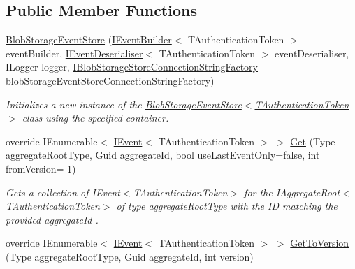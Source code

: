 \subsection*{Public Member Functions}
\begin{DoxyCompactItemize}
\item 
\hyperlink{classCqrs_1_1Azure_1_1BlobStorage_1_1Events_1_1BlobStorageEventStore_a04ce4516e7e1d30339d3f04ba54abe54_a04ce4516e7e1d30339d3f04ba54abe54}{Blob\+Storage\+Event\+Store} (\hyperlink{interfaceCqrs_1_1Events_1_1IEventBuilder}{I\+Event\+Builder}$<$ T\+Authentication\+Token $>$ event\+Builder, \hyperlink{interfaceCqrs_1_1Events_1_1IEventDeserialiser}{I\+Event\+Deserialiser}$<$ T\+Authentication\+Token $>$ event\+Deserialiser, I\+Logger logger, \hyperlink{interfaceCqrs_1_1Azure_1_1BlobStorage_1_1IBlobStorageStoreConnectionStringFactory}{I\+Blob\+Storage\+Store\+Connection\+String\+Factory} blob\+Storage\+Event\+Store\+Connection\+String\+Factory)
\begin{DoxyCompactList}\small\item\em Initializes a new instance of the \hyperlink{classCqrs_1_1Azure_1_1BlobStorage_1_1Events_1_1BlobStorageEventStore_a04ce4516e7e1d30339d3f04ba54abe54_a04ce4516e7e1d30339d3f04ba54abe54}{Blob\+Storage\+Event\+Store$<$\+T\+Authentication\+Token$>$} class using the specified container. \end{DoxyCompactList}\item 
override I\+Enumerable$<$ \hyperlink{interfaceCqrs_1_1Events_1_1IEvent}{I\+Event}$<$ T\+Authentication\+Token $>$ $>$ \hyperlink{classCqrs_1_1Azure_1_1BlobStorage_1_1Events_1_1BlobStorageEventStore_ab68b594c54ae5a79e3b8d5db1902752d_ab68b594c54ae5a79e3b8d5db1902752d}{Get} (Type aggregate\+Root\+Type, Guid aggregate\+Id, bool use\+Last\+Event\+Only=false, int from\+Version=-\/1)
\begin{DoxyCompactList}\small\item\em Gets a collection of I\+Event$<$\+T\+Authentication\+Token$>$ for the I\+Aggregate\+Root$<$\+T\+Authentication\+Token$>$ of type {\itshape aggregate\+Root\+Type}  with the ID matching the provided {\itshape aggregate\+Id} . \end{DoxyCompactList}\item 
override I\+Enumerable$<$ \hyperlink{interfaceCqrs_1_1Events_1_1IEvent}{I\+Event}$<$ T\+Authentication\+Token $>$ $>$ \hyperlink{classCqrs_1_1Azure_1_1BlobStorage_1_1Events_1_1BlobStorageEventStore_a46382e3a34210cbc655be11eafdc05d6_a46382e3a34210cbc655be11eafdc05d6}{Get\+To\+Version} (Type aggregate\+Root\+Type, Guid aggregate\+Id, int version)

\end{DoxyCompactItemize}

